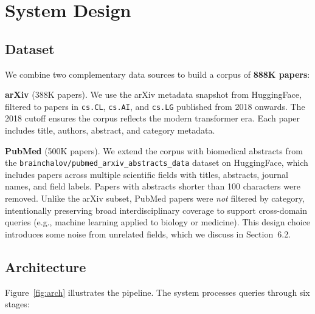 \documentclass[11pt,a4paper]{article}
\begin{document}
\section{System Design}

\subsection{Dataset}

We combine two complementary data sources to build a corpus of \textbf{888K papers}:

\textbf{arXiv} (388K papers). We use the arXiv metadata snapshot from HuggingFace, filtered to papers in \texttt{cs.CL}, \texttt{cs.AI}, and \texttt{cs.LG} published from 2018 onwards. The 2018 cutoff ensures the corpus reflects the modern transformer era. Each paper includes title, authors, abstract, and category metadata.

\textbf{PubMed} (500K papers). We extend the corpus with biomedical abstracts from the \texttt{brainchalov/pubmed\_arxiv\_abstracts\_data} dataset on HuggingFace, which includes papers across multiple scientific fields with titles, abstracts, journal names, and field labels. Papers with abstracts shorter than 100 characters were removed. Unlike the arXiv subset, PubMed papers were \emph{not} filtered by category, intentionally preserving broad interdisciplinary coverage to support cross-domain queries (e.g., machine learning applied to biology or medicine). This design choice introduces some noise from unrelated fields, which we discuss in Section~6.2.

\subsection{Architecture}

Figure~\ref{fig:arch} illustrates the pipeline. The system processes queries through six stages:
\end{document}
